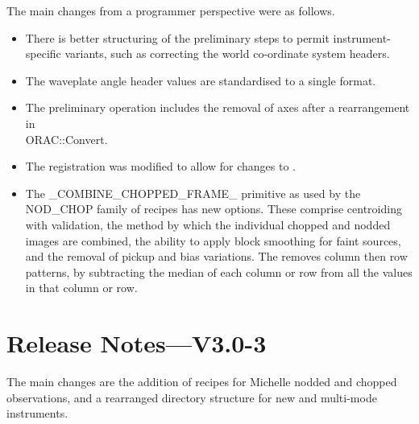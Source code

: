 \documentclass[twoside,11pt,nolof]{starlink}
\providecommand{\CCDPACK}{{\footnotesize CCDPACK}}
\begin{document}
The main changes from a programmer perspective were as follows.

\begin{itemize}
   \item There is better structuring of the preliminary steps to
         permit instrument-specific variants, such as correcting the
         world co-ordinate system headers.

   \item The waveplate angle header values are standardised to a
         single format.

   \item The preliminary operation includes the removal of axes
         after a rearrangement in \\
         ORAC::Convert.

   \item The registration was modified to allow for changes to
         \xref{\CCDPACK}{sun139}{}.

   \item The \_COMBINE\_CHOPPED\_FRAME\_ primitive as used by the
         NOD\_CHOP family of recipes has new options.  These comprise
         centroiding with validation, the method by which the
         individual chopped and nodded images are combined,
         the ability to apply block smoothing for faint sources,
         and the removal of pickup and bias variations.  The
         removes column then row patterns, by subtracting the
         median of each column or row from all the values in that
         column or row.
\end{itemize}

\section{Release Notes---V3.0-3\label{se_changes3p0}}

The main changes are the addition of recipes for Michelle nodded and
chopped observations, and a rearranged directory structure for new and
multi-mode instruments.
\end{document}
